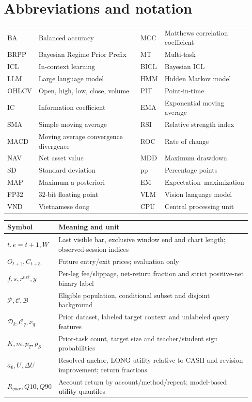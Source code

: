 \chapter*{Abbreviations and notation}
\begingroup\small{}
\begin{tabular}{@{}P{.13\linewidth}P{.32\linewidth}P{.12\linewidth}P{.32\linewidth}@{}}\toprule
BA & Balanced accuracy & MCC & Matthews correlation coefficient\\
BRPP & Bayesian Regime Prior Prefix & MT & Multi-task\\
ICL & In-context learning & BICL & Bayesian ICL\\
LLM & Large language model & HMM & Hidden Markov model\\
OHLCV & Open, high, low, close, volume & PIT & Point-in-time\\
IC & Information coefficient & EMA & Exponential moving average\\
SMA & Simple moving average & RSI & Relative strength index\\
MACD & Moving average convergence divergence & ROC & Rate of change\\
NAV & Net asset value & MDD & Maximum drawdown\\
SD & Standard deviation & pp & Percentage points\\
MAP & Maximum a posteriori & EM & Expectation--maximization\\
FP32 & 32-bit floating point & VLM & Vision language model\\
VND & Vietnamese dong & CPU & Central processing unit\\\bottomrule
\end{tabular}
\medskip

\begin{tabular}{@{}p{.23\linewidth}p{.70\linewidth}@{}}\toprule
Symbol & Meaning and unit\\\midrule
$t,e=t+1,W$ & Last visible bar, exclusive window end and chart length; observed-session indices\\
$O_{t+1},C_{t+3}$ & Future entry/exit prices; evaluation only\\
$f,s,r^{net},y$ & Per-leg fee/slippage, net-return fraction and strict positive-net binary label\\
$\mathcal P,\mathcal C,\mathcal B$ & Eligible population, conditional subset and disjoint background\\
$\mathcal D_k,\mathcal C_q,x_q$ & Prior dataset, labeled target context and unlabeled query features\\
$K,m,p_T,p_S$ & Prior-task count, target size and teacher/student sign probabilities\\
$a_0,U,\Delta U$ & Resolved anchor, LONG utility relative to CASH and revision improvement; return fractions\\
$R_{qmr},Q10,Q90$ & Account return by account/method/repeat; model-based utility quantiles\\\bottomrule
\end{tabular}
\endgroup

